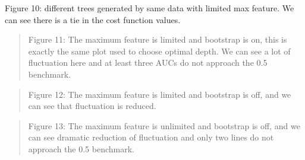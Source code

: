 \documentclass{article}
\newcommand{\ciapdf}[1]{\vspace*{-\parskip}\begin{center}\resizebox{0.75\textwidth}{!}{\texttt{[image: \#1]}}\end{center}}
\begin{document}
\vspace*{-\parskip}

Figure 10:
different trees generated by same data with limited max feature. We can see
there is a tie in the cost function values.

\ciapdf{app_samedata_1.pdf}

\ciapdf{app_samedata_2.pdf}

\ciapdf{Figure_8.pdf}
\begin{quote}
Figure 11: The maximum feature is limited and bootstrap is on, this is
exactly the same plot used to choose optimal depth. We can see a lot of
fluctuation here and at least three AUCs do not approach the 0.5 benchmark.
\end{quote}

\ciapdf{Figure_9.pdf}
\begin{quote}
Figure 12: The maximum feature is limited and bootstrap is off, and we can
see that fluctuation is reduced.
\end{quote}

\ciapdf{Figure_10.pdf}
\begin{quote}
Figure 13: The maximum feature is unlimited and bootstrap is off, and we
can see dramatic reduction of fluctuation and only two lines do not
approach the 0.5 benchmark.
\end{quote}
\end{document}

